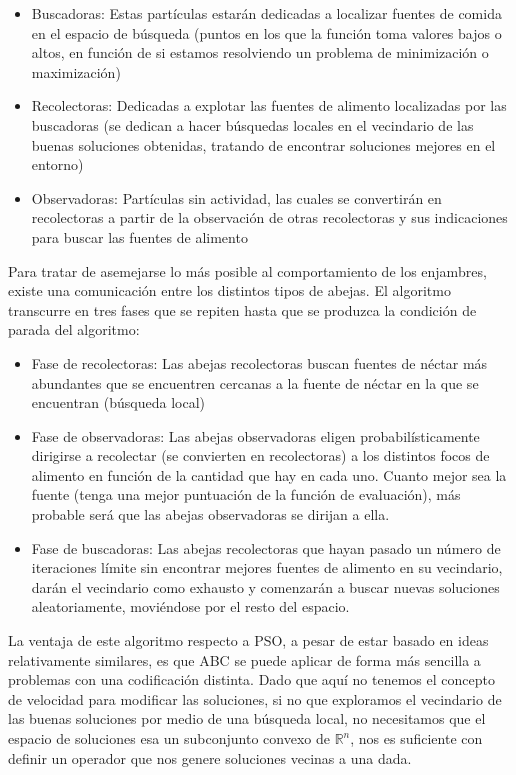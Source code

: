 \documentclass[
  a4paper,
,tablecaptionabove
]{scrartcl}
\providecommand{\tightlist}{%
  \setlength{\itemsep}{0pt}\setlength{\parskip}{0pt}}
\begin{document}
\begin{itemize}
\tightlist
\item
  Buscadoras: Estas partículas estarán dedicadas a localizar fuentes de
  comida en el espacio de búsqueda (puntos en los que la función toma
  valores bajos o altos, en función de si estamos resolviendo un
  problema de minimización o maximización)
\item
  Recolectoras: Dedicadas a explotar las fuentes de alimento localizadas
  por las buscadoras (se dedican a hacer búsquedas locales en el
  vecindario de las buenas soluciones obtenidas, tratando de encontrar
  soluciones mejores en el entorno)
\item
  Observadoras: Partículas sin actividad, las cuales se convertirán en
  recolectoras a partir de la observación de otras recolectoras y sus
  indicaciones para buscar las fuentes de alimento
\end{itemize}

Para tratar de asemejarse lo más posible al comportamiento de los
enjambres, existe una comunicación entre los distintos tipos de abejas.
El algoritmo transcurre en tres fases que se repiten hasta que se
produzca la condición de parada del algoritmo:

\begin{itemize}
\tightlist
\item
  Fase de recolectoras: Las abejas recolectoras buscan fuentes de néctar
  más abundantes que se encuentren cercanas a la fuente de néctar en la
  que se encuentran (búsqueda local)
\item
  Fase de observadoras: Las abejas observadoras eligen
  probabilísticamente dirigirse a recolectar (se convierten en
  recolectoras) a los distintos focos de alimento en función de la
  cantidad que hay en cada uno. Cuanto mejor sea la fuente (tenga una
  mejor puntuación de la función de evaluación), más probable será que
  las abejas observadoras se dirijan a ella.
\item
  Fase de buscadoras: Las abejas recolectoras que hayan pasado un número
  de iteraciones límite sin encontrar mejores fuentes de alimento en su
  vecindario, darán el vecindario como exhausto y comenzarán a buscar
  nuevas soluciones aleatoriamente, moviéndose por el resto del espacio.
\end{itemize}

La ventaja de este algoritmo respecto a PSO, a pesar de estar basado en
ideas relativamente similares, es que ABC se puede aplicar de forma más
sencilla a problemas con una codificación distinta. Dado que aquí no
tenemos el concepto de velocidad para modificar las soluciones, si no
que exploramos el vecindario de las buenas soluciones por medio de una
búsqueda local, no necesitamos que el espacio de soluciones esa un
subconjunto convexo de \(\mathbb{R}^n\), nos es suficiente con definir
un operador que nos genere soluciones vecinas a una dada.
\end{document}
